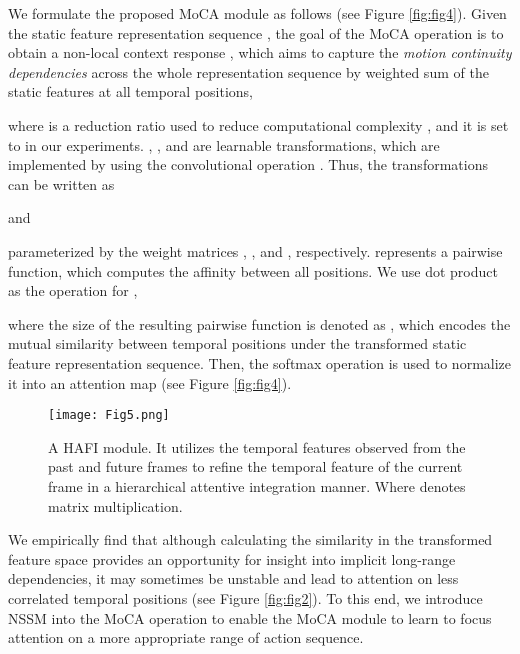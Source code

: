 \documentclass[10pt,twocolumn,letterpaper]{article}
\begin{document}
We formulate the proposed MoCA module as follows (see Figure \ref{fig:fig4}). Given the static feature representation sequence , the goal of the MoCA operation is to obtain a non-local context response , which aims to capture the \textit{motion continuity dependencies} across the whole representation sequence by weighted sum of the static features at all temporal positions,\vspace{-4pt}

where  is a reduction ratio used to reduce computational complexity \cite{Wang2018NonlocalNN}, and it is set to  in our experiments. , , and   are learnable transformations, which are implemented by using the convolutional operation \cite{Wang2018NonlocalNN}. Thus, the transformations can be written as\vspace{-4pt}
 

and\vspace{-5pt}

parameterized by the weight matrices ,
, and
, respectively.  represents a pairwise function, which computes the affinity between all positions. We use dot product \cite{Wang2018NonlocalNN} as the operation for , \ie\vspace{-4pt}

where the size of the resulting pairwise function  is denoted as , which encodes the mutual similarity between temporal positions under the transformed static feature representation sequence. Then, the softmax operation is used to normalize it into an attention map (see Figure \ref{fig:fig4}). 

\begin{figure*}[t]
  \centering
  \texttt{[image: Fig5.png]}\vspace{-9pt}
  \caption{A HAFI module. It utilizes the temporal features observed from the past and future frames to refine the temporal feature of the current frame  in a hierarchical attentive integration manner. Where  denotes matrix multiplication.}\vspace{-12pt}
  \label{fig:fig5}
\end{figure*}

We empirically find that although calculating the similarity in the transformed feature space provides an opportunity for insight into implicit long-range dependencies, it may sometimes be unstable and lead to attention on less correlated temporal positions (see Figure \ref{fig:fig2}). To this end, we introduce NSSM into the MoCA operation to enable the MoCA module to learn to focus attention on a more appropriate range of action sequence.
\end{document}
